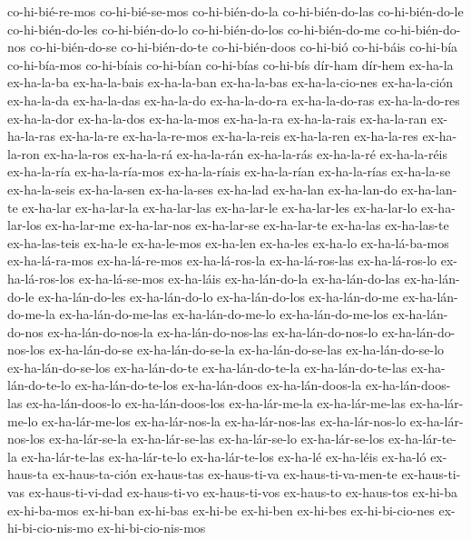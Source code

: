 {co-hi-bié-re-mos     
co-hi-bié-se-mos     
co-hi-bién-do-la     
co-hi-bién-do-las    
co-hi-bién-do-le     
co-hi-bién-do-les    
co-hi-bién-do-lo     
co-hi-bién-do-los    
co-hi-bién-do-me     
co-hi-bién-do-nos    
co-hi-bién-do-se     
co-hi-bién-do-te     
co-hi-bién-doos      
co-hi-bió            
co-hi-báis           
co-hi-bía            
co-hi-bía-mos        
co-hi-bíais          
co-hi-bían           
co-hi-bías           
co-hi-bís                   
dír-ham
dír-hem
ex-ha-la
ex-ha-la-ba
ex-ha-la-bais
ex-ha-la-ban
ex-ha-la-bas
ex-ha-la-cio-nes
ex-ha-la-ción
ex-ha-la-da
ex-ha-la-das
ex-ha-la-do
ex-ha-la-do-ra
ex-ha-la-do-ras
ex-ha-la-do-res
ex-ha-la-dor
ex-ha-la-dos
ex-ha-la-mos
ex-ha-la-ra
ex-ha-la-rais
ex-ha-la-ran
ex-ha-la-ras
ex-ha-la-re
ex-ha-la-re-mos
ex-ha-la-reis
ex-ha-la-ren
ex-ha-la-res
ex-ha-la-ron
ex-ha-la-ros
ex-ha-la-rá
ex-ha-la-rán
ex-ha-la-rás
ex-ha-la-ré
ex-ha-la-réis
ex-ha-la-ría
ex-ha-la-ría-mos
ex-ha-la-ríais
ex-ha-la-rían
ex-ha-la-rías
ex-ha-la-se
ex-ha-la-seis
ex-ha-la-sen
ex-ha-la-ses
ex-ha-lad
ex-ha-lan
ex-ha-lan-do
ex-ha-lan-te
ex-ha-lar
ex-ha-lar-la
ex-ha-lar-las
ex-ha-lar-le
ex-ha-lar-les
ex-ha-lar-lo
ex-ha-lar-los
ex-ha-lar-me
ex-ha-lar-nos
ex-ha-lar-se
ex-ha-lar-te
ex-ha-las
ex-ha-las-te
ex-ha-las-teis
ex-ha-le
ex-ha-le-mos
ex-ha-len
ex-ha-les
ex-ha-lo
ex-ha-lá-ba-mos
ex-ha-lá-ra-mos
ex-ha-lá-re-mos
ex-ha-lá-ros-la
ex-ha-lá-ros-las
ex-ha-lá-ros-lo
ex-ha-lá-ros-los
ex-ha-lá-se-mos
ex-ha-láis
ex-ha-lán-do-la
ex-ha-lán-do-las
ex-ha-lán-do-le
ex-ha-lán-do-les
ex-ha-lán-do-lo
ex-ha-lán-do-los
ex-ha-lán-do-me
ex-ha-lán-do-me-la
ex-ha-lán-do-me-las
ex-ha-lán-do-me-lo
ex-ha-lán-do-me-los
ex-ha-lán-do-nos
ex-ha-lán-do-nos-la
ex-ha-lán-do-nos-las
ex-ha-lán-do-nos-lo
ex-ha-lán-do-nos-los
ex-ha-lán-do-se
ex-ha-lán-do-se-la
ex-ha-lán-do-se-las
ex-ha-lán-do-se-lo
ex-ha-lán-do-se-los
ex-ha-lán-do-te
ex-ha-lán-do-te-la
ex-ha-lán-do-te-las
ex-ha-lán-do-te-lo
ex-ha-lán-do-te-los
ex-ha-lán-doos
ex-ha-lán-doos-la
ex-ha-lán-doos-las
ex-ha-lán-doos-lo
ex-ha-lán-doos-los
ex-ha-lár-me-la
ex-ha-lár-me-las
ex-ha-lár-me-lo
ex-ha-lár-me-los
ex-ha-lár-nos-la
ex-ha-lár-nos-las
ex-ha-lár-nos-lo
ex-ha-lár-nos-los
ex-ha-lár-se-la
ex-ha-lár-se-las
ex-ha-lár-se-lo
ex-ha-lár-se-los
ex-ha-lár-te-la
ex-ha-lár-te-las
ex-ha-lár-te-lo
ex-ha-lár-te-los
ex-ha-lé
ex-ha-léis
ex-ha-ló
ex-haus-ta
ex-haus-ta-ción
ex-haus-tas
ex-haus-ti-va
ex-haus-ti-va-men-te
ex-haus-ti-vas
ex-haus-ti-vi-dad
ex-haus-ti-vo
ex-haus-ti-vos
ex-haus-to
ex-haus-tos
ex-hi-ba
ex-hi-ba-mos
ex-hi-ban
ex-hi-bas
ex-hi-be
ex-hi-ben
ex-hi-bes
ex-hi-bi-cio-nes
ex-hi-bi-cio-nis-mo
ex-hi-bi-cio-nis-mos
}
